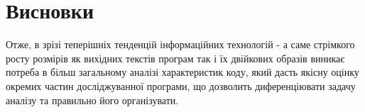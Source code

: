 \pagebreak

\section*{Висновки}
Отже, в зрізі теперішніх тенденцій інформаційних технологій  - а саме стрімкого росту розмірів як вихідних текстів програм так і їх двійкових образів виникає потреба в більш загальному аналізі характеристик коду, який дасть якісну оцінку окремих частин досліджуванної програми, що дозволить диференціювати задачу аналізу та правильно його організувати.
